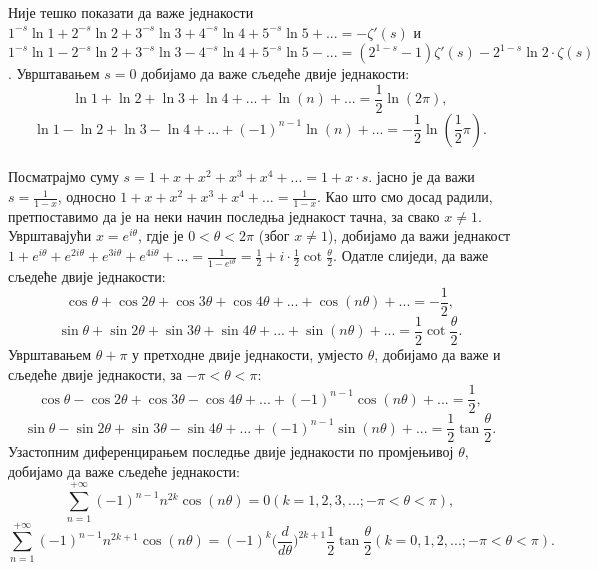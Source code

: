 \documentclass[12pt]{article}
\begin{document}
Није тешко показати да важе једнакости $1^{-s}\ln1+2^{-s}\ln2+3^{-s}\ln3+4^{-s}\ln4+5^{-s}\ln5+...=-\zeta'(s)$ и $1^{-s}\ln1-2^{-s}\ln2+3^{-s}\ln3-4^{-s}\ln4+5^{-s}\ln5-...=(2^{1-s}-1)\zeta'(s)-2^{1-s}\ln2\cdot\zeta(s)$. Уврштавањем $s=0$ добијамо да важе сљедеће двије једнакости: \begin{equation}
\ln1+\ln2+\ln3+\ln4+...+\ln(n)+...=\frac{1}{2}\ln(2\pi),
\end{equation}\begin{equation}
\ln1-\ln2+\ln3-\ln4+...+(-1)^{n-1}\ln(n)+...=-\frac{1}{2}\ln(\frac{1}{2}\pi).
\end{equation}\\
Посматрајмо суму $s=1+x+x^2+x^3+x^4+...=1+x\cdot s$. јасно је да важи $s=\frac{1}{1-x}$, односно $1+x+x^2+x^3+x^4+...=\frac{1}{1-x}$. Као што смо досад радили, претпоставимо да је на неки начин последња једнакост тачна, за свако $x\not=1$. Уврштавајући $x=e^{i\theta}$, гдје је $0<\theta<2\pi$ (због $x\not=1$), добијамо да важи једнакост $1+e^{i\theta}+e^{2i\theta}+e^{3i\theta}+e^{4i\theta}+...=\frac{1}{1-e^{i\theta}}=\frac{1}{2}+i\cdot\frac{1}{2}\cot\frac{\theta}{2}$. Одатле слиједи, да важе сљедеће двије једнакости: \begin{equation}
\cos\theta+\cos2\theta+\cos3\theta+\cos4\theta+...+\cos (n\theta)+...=-\frac{1}{2},
\end{equation} \begin{equation}
\sin\theta+\sin2\theta+\sin3\theta+\sin4\theta+...+\sin (n\theta)+...=\frac{1}{2}\cot\frac{\theta}{2}.
\end{equation} Уврштавањем $\theta+\pi$ у претходне двије једнакости, умјесто $\theta$, добијамо да важе и сљедеће двије једнакости, за $-\pi<\theta<\pi$: \begin{equation}
\cos\theta-\cos2\theta+\cos3\theta-\cos4\theta+...+(-1)^{n-1}\cos (n\theta)+...=\frac{1}{2},
\end{equation} \begin{equation}
\sin\theta-\sin2\theta+\sin3\theta-\sin4\theta+...+(-1)^{n-1}\sin (n\theta)+...=\frac{1}{2}\tan\frac{\theta}{2}.
\end{equation} Узастопним диференцирањем последње двије једнакости по промјењивој $\theta$, добијамо да важе сљедеће једнакости: $$\sum_{n=1}^{+\infty}(-1)^{n-1}n^{2k}\cos(n\theta)=0 (k=1,2,3,...;-\pi<\theta<\pi),$$ $$\sum_{n=1}^{+\infty}(-1)^{n-1}n^{2k+1}\cos(n\theta)=(-1)^k\bigg(\frac{d}{d\theta}\bigg)^{2k+1}\frac{1}{2}\tan\frac{\theta}{2} (k=0,1,2,...;-\pi<\theta<\pi).$$
\end{document}
